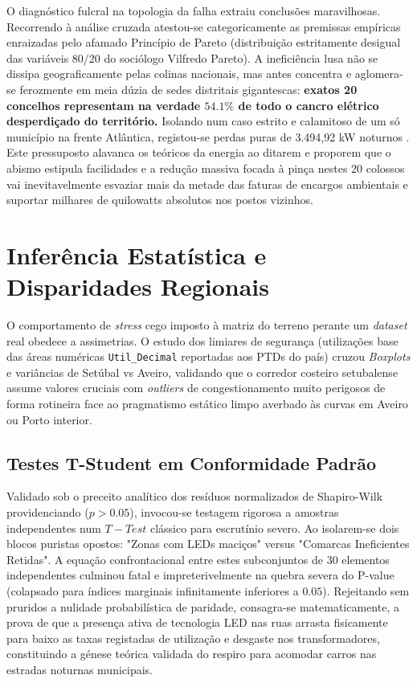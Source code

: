 \documentclass[conference]{IEEEtran}
\begin{document}
O diagnóstico fulcral na topologia da falha extraiu conclusões maravilhosas. Recorrendo à análise cruzada atestou-se categoricamente as premissas empíricas enraizadas pelo afamado Princípio de Pareto (distribuição estritamente desigual das variáveis 80/20 do sociólogo Vilfredo Pareto). A ineficiência lusa não se dissipa geograficamente pelas colinas nacionais, mas antes concentra e aglomera-se ferozmente em meia dúzia de sedes distritais gigantescas: \textbf{exatos 20 concelhos representam na verdade $54.1\%$ de todo o cancro elétrico desperdiçado do território.} Isolando num caso estrito e calamitoso de um só município na frente Atlântica, registou-se perdas puras de 3.494,92 kW noturnos \cite{b4}. Este pressuposto alavanca os teóricos da energia ao ditarem e proporem que o abismo estipula facilidades e a redução massiva focada à pinça nestes 20 colossos vai inevitavelmente esvaziar mais da metade das faturas de encargos ambientais e suportar milhares de quilowatts absolutos nos postos vizinhos.


\section{Inferência Estatística e Disparidades Regionais}
O comportamento de \textit{stress} cego imposto à matriz do terreno perante um \textit{dataset} real obedece a assimetrias. O estudo dos limiares de segurança (utilizações base das áreas numéricas \texttt{Util\_Decimal} reportadas aos PTDs do país) cruzou \textit{Boxplots} e variâncias de Setúbal vs Aveiro, validando que o corredor costeiro setubalense assume valores cruciais com \textit{outliers} de congestionamento muito perigosos de forma rotineira face ao pragmatismo estático limpo averbado às curvas em Aveiro ou Porto interior.

\subsection{Testes T-Student em Conformidade Padrão}
Validado sob o preceito analítico dos resíduos normalizados de Shapiro-Wilk providenciando ($p > 0.05$), invocou-se testagem rigorosa a amostras independentes num $T-Test$ clássico para escrutínio severo. Ao isolarem-se dois blocos puristas opostos: "Zonas com LEDs maciços" versus "Comarcas Ineficientes Retidas". A equação confrontacional entre estes subconjuntos de 30 elementos independentes culminou fatal e impreterivelmente na quebra severa do P-value (colapsado para índices marginais infinitamente inferiores a $0.05$). Rejeitando sem pruridos a nulidade probabilística de paridade, consagra-se matematicamente, a prova de que a presença ativa de tecnologia LED nas ruas arrasta fisicamente para baixo as taxas registadas de utilização e desgaste nos transformadores, constituindo a génese teórica validada do respiro para acomodar carros nas estradas noturnas municipais.
\end{document}
